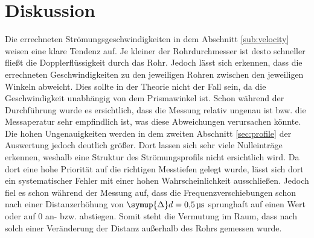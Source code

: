 \section{Diskussion}
\label{sec:Diskussion}
Die errechneten Strömungsgeschwindigkeiten in dem Abschnitt \ref{sub:velocity} weisen eine klare Tendenz auf.
Je kleiner der Rohrdurchmesser ist desto schneller fließt die Dopplerflüssigkeit durch das Rohr.
Jedoch lässt sich erkennen, dass die errechneten Geschwindigkeiten zu den jeweiligen Rohren zwischen den jeweiligen
Winkeln abweicht.
Dies sollte in der Theorie nicht der Fall sein, da die Geschwindigkeit unabhängig von dem Prismawinkel ist.
Schon während der Durchführung wurde es ersichtlich, dass die Messung relativ ungenau ist bzw. die Messaperatur sehr empfindlich ist,
was diese Abweichungen verursachen könnte.
Die hohen Ungenauigkeiten werden in dem zweiten Abschnitt \ref{sec:profile} der Auswertung jedoch deutlich größer.
Dort lassen sich sehr viele Nulleinträge erkennen, weshalb eine Struktur des Strömungsprofils nicht ersichtlich wird.
Da dort eine hohe Priorität auf die richtigen Messtiefen gelegt wurde, lässt sich dort ein systematischer Fehler
mit einer hohen Wahrscheinlichkeit ausschließen. 
Jedoch fiel es schon während der Messung auf, dass die Frequenzverschiebungen schon nach einer Distanzerhöhung von $\symup{\Delta} d = \SI{0.5}{\micro\second}$
sprunghaft auf einen Wert oder auf 0 an- bzw. abstiegen. 
Somit steht die Vermutung im Raum, dass nach solch einer Veränderung der Distanz außerhalb des Rohrs gemessen wurde.